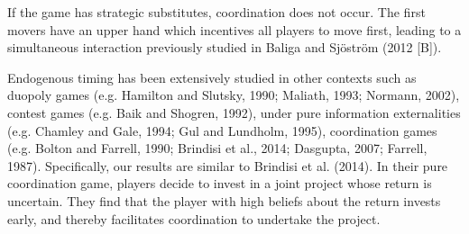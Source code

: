 \documentclass[12pt,english]{article}
\begin{document}
If the game has strategic substitutes, coordination does not occur. The first movers have an upper hand which incentives all players to move first, leading to a simultaneous interaction previously studied in Baliga and Sj\"ostr\"om (2012 [B]).\par  %
Endogenous timing has been extensively studied in other contexts such as duopoly games (e.g. Hamilton and Slutsky, 1990; Maliath, 1993; Normann, 2002), contest games (e.g. Baik and Shogren, 1992), under pure information externalities (e.g. Chamley and Gale, 1994; Gul and Lundholm, 1995), coordination games (e.g. Bolton and Farrell, 1990; Brindisi et al., 2014; Dasgupta, 2007; Farrell, 1987). Specifically, our results are similar to Brindisi et al. (2014). In their pure coordination game, players decide to invest in a joint project whose return is uncertain. They find that the player with high beliefs about the return invests early, and thereby facilitates coordination to undertake the project. \par
\end{document}
